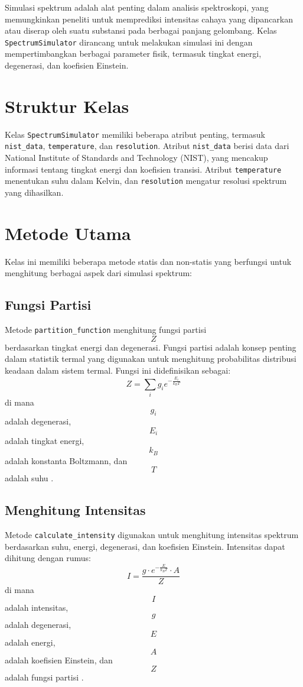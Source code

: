 \par Simulasi spektrum adalah alat penting dalam analisis spektroskopi, yang memungkinkan peneliti untuk memprediksi intensitas cahaya yang dipancarkan atau diserap oleh suatu substansi pada berbagai panjang gelombang. Kelas \texttt{SpectrumSimulator} dirancang untuk melakukan simulasi ini dengan mempertimbangkan berbagai parameter fisik, termasuk tingkat energi, degenerasi, dan koefisien Einstein.

\section{Struktur Kelas}
\par Kelas \texttt{SpectrumSimulator} memiliki beberapa atribut penting, termasuk \texttt{nist\_data}, \texttt{temperature}, dan \texttt{resolution}. Atribut \texttt{nist\_data} berisi data dari National Institute of Standards and Technology (NIST), yang mencakup informasi tentang tingkat energi dan koefisien transisi. Atribut \texttt{temperature} menentukan suhu dalam Kelvin, dan \texttt{resolution} mengatur resolusi spektrum yang dihasilkan.

\section{Metode Utama}
\par Kelas ini memiliki beberapa metode statis dan non-statis yang berfungsi untuk menghitung berbagai aspek dari simulasi spektrum:

\subsection{Fungsi Partisi}
\par Metode \texttt{partition\_function} menghitung fungsi partisi $$Z$$ berdasarkan tingkat energi dan degenerasi. Fungsi partisi adalah konsep penting dalam statistik termal yang digunakan untuk menghitung probabilitas distribusi keadaan dalam sistem termal. Fungsi ini didefinisikan sebagai:
$$
Z = \sum_{i} g_i e^{-\frac{E_i}{k_B T}}
$$
di mana $$g_i$$ adalah degenerasi, $$E_i$$ adalah tingkat energi, $$k_B$$ adalah konstanta Boltzmann, dan $$T$$ adalah suhu \citep{pathria2011}.

\subsection{Menghitung Intensitas}
\par Metode \texttt{calculate\_intensity} digunakan untuk menghitung intensitas spektrum berdasarkan suhu, energi, degenerasi, dan koefisien Einstein. Intensitas dapat dihitung dengan rumus:
$$
I = \frac{g \cdot e^{-\frac{E}{k_B T}} \cdot A}{Z}
$$
di mana $$I$$ adalah intensitas, $$g$$ adalah degenerasi, $$E$$ adalah energi, $$A$$ adalah koefisien Einstein, dan $$Z$$ adalah fungsi partisi \citep{mason2015}.


